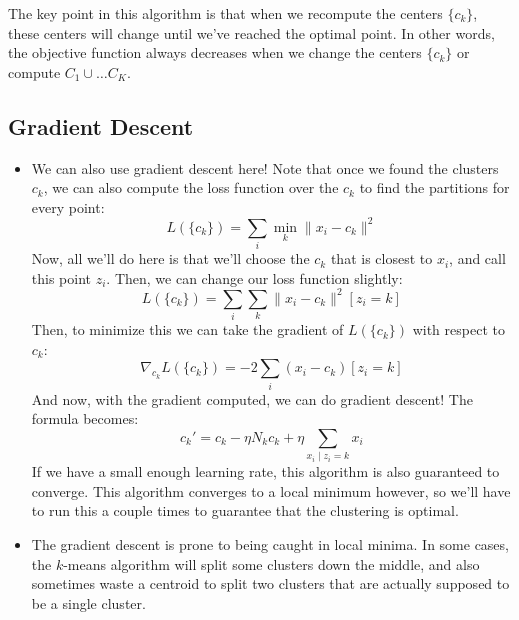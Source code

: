 \begin{itemize}
		The key point in this algorithm is that when we recompute the centers \( \{c_k\} \), these centers
		will change until we've reached the optimal point. In other words, the objective function always
		decreases when we change the centers \( \{c_k\} \) or compute \( C_1 \cup \dots
		C_K \).   

\end{itemize}

\subsection{Gradient Descent}
\begin{itemize}
	\item We can also use gradient descent here! Note that once we found the clusters \( c_k \), we can also
		compute the loss function over the \( c_k \) to find the partitions for every point: 
		\[
			L(\{c_k\}) = \sum_{i}\min_k \|x_i - c_k\|^2
		\]
		Now, all we'll do here is that we'll choose the \( c_k \) that is closest to \( x_i \), and call this
		point \( z_i \). Then, we can change our loss function slightly:
		\[
			L(\{c_k\}) = \sum_i \sum_k \|x_i - c_k\|^2 [z_i = k]
		\]
		Then, to minimize this we can take the gradient of \( L(\{c_k\}) \) with respect to \( c_k \):
		\[
			\nabla_{c_k}L(\{c_k\}) = -2 \sum_i (x_i - c_k) [z_i = k]
		\]
		And now, with the gradient computed, we can do gradient descent! The formula becomes:
		\[
			c_k' = c_k  - \eta N_k c_k + \eta \sum_{x_i \mid z_i = k}x_i
		\]
		 If we have a small enough learning rate, this algorithm is also
		guaranteed to converge. This algorithm converges to a local minimum however, so we'll have to run
		this a couple times to guarantee that the clustering is optimal. 

	\item The gradient descent is prone to being caught in local minima. In some cases, the \( k \)-means
		algorithm will split some clusters down the middle, and also sometimes waste a centroid to split two
		clusters that are actually supposed to be a single cluster.  
\end{itemize}

